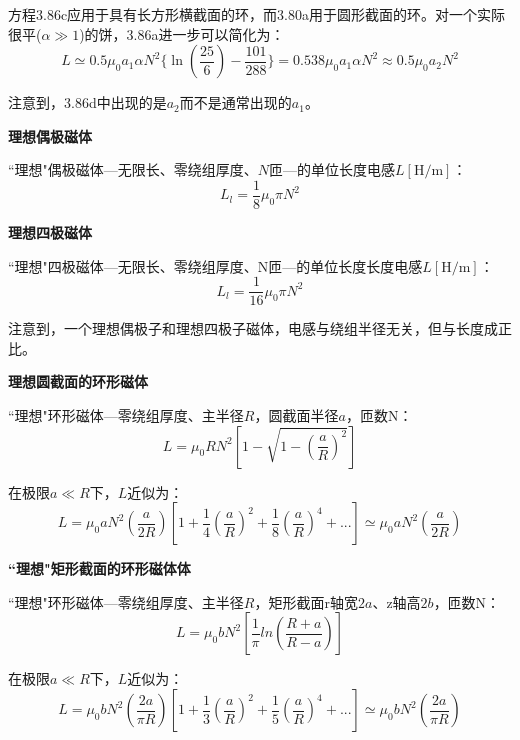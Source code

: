 方程3.86c应用于具有长方形横截面的环，而3.80a用于圆形截面的环。对一个实际很平($\alpha\gg 1$)的饼，3.86a进一步可以简化为：
\begin{equation*}
L  \simeq  0.5\mu_0a_1\alpha N^2\{\ln(\frac{25}{6})-\frac{101}{288}\}=0.538\mu_0a_1\alpha N^2\approx 0.5\mu_0a_2N^2 \tag{3.86'''}%
\end{equation*}

注意到，3.86d中出现的是$a_2$而不是通常出现的$a_1$。

\textbf{理想偶极磁体}

  ``理想"偶极磁体---无限长、零绕组厚度、$N$匝---的单位长度电感$L\mathrm{[H/m]}$：
\begin{equation}
L_l=\frac{1}{8}\mu_0\pi N^2%
\end{equation}

\textbf{理想四极磁体}

  ``理想"四极磁体---无限长、零绕组厚度、N匝---的单位长度长度电感$L\mathrm{[H/m]}$：
  \begin{equation}
L_l=\frac{1}{16}\mu_0\pi N^2%
\end{equation}

注意到，一个理想偶极子和理想四极子磁体，电感与绕组半径无关，但与长度成正比。

\textbf{理想圆截面的环形磁体}

  ``理想"环形磁体---零绕组厚度、主半径$R$，圆截面半径$a$，匝数N：
  \begin{equation}
 L=\mu_0RN^2[1-\sqrt{1-(\frac{a}{R})^2}]%
\end{equation}

在极限$a\ll R$下，$L$近似为：
\begin{equation*}
 L=\mu_0aN^2(\frac{a}{2R})[1+\frac{1}{4}(\frac{a}{R})^2+\frac{1}{8}(\frac{a}{R})^4+...]\simeq\mu_0aN^2(\frac{a}{2R}) \tag{3.89'}%
\end{equation*}

\textbf{``理想"矩形截面的环形磁体体}

``理想"环形磁体---零绕组厚度、主半径$R$，矩形截面r轴宽$2a$、z轴高$2b$，匝数N：
  \begin{equation}
L=\mu_0bN^2[\frac{1}{\pi}ln(\frac{R+a}{R-a})]%
\end{equation}

在极限$a\ll R$下，$L$近似为：
\begin{equation*}
L=\mu_0bN^2(\frac{2a}{\pi R})[1+\frac{1}{3}(\frac{a}{R})^2+\frac{1}{5}(\frac{a}{R})^4+...]\simeq\mu_0bN^2(\frac{2a}{\pi R}) \tag{3.90'}%
\end{equation*}



